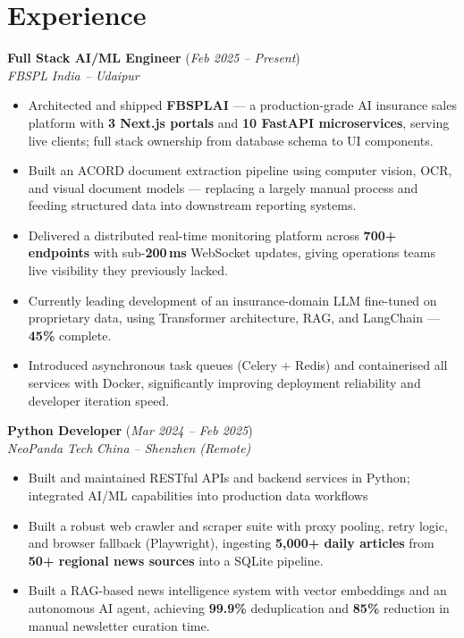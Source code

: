 \documentclass[10pt,letterpaper]{article}
\newcommand{\jobheader}[4]{%
  \textbf{#1} (\textit{#4})\\
  \textit{#2} \textemdash{} \textit{#3}
  \vspace{0.04cm}
}
\begin{document}
\vspace{0.05cm}

\section{Experience}

\jobheader{Full Stack AI/ML Engineer}{FBSPL}{India -- Udaipur}{Feb 2025 -- Present}
\begin{itemize}
  \item Architected and shipped \textbf{FBSPLAI} --- a production-grade AI insurance sales platform
  with \textbf{3 Next.js portals} and \textbf{10 FastAPI microservices}, serving live clients;
  full stack ownership from database schema to UI components.
  \item Built an ACORD document extraction pipeline using computer vision, OCR, and visual document
  models --- replacing a largely manual process and feeding structured data into downstream
  reporting systems.
  \item Delivered a distributed real-time monitoring platform across \textbf{700+ endpoints} with
  sub-\textbf{200\,ms} WebSocket updates, giving operations teams live visibility they previously lacked.
  \item Currently leading development of an insurance-domain LLM fine-tuned on proprietary data,
  using Transformer architecture, RAG, and LangChain --- \textbf{45\%} complete.
  \item Introduced asynchronous task queues (Celery + Redis) and containerised all services with
  Docker, significantly improving deployment reliability and developer iteration speed.
\end{itemize}

\vspace{0.12cm}

\jobheader{Python Developer}{NeoPanda Tech}{China -- Shenzhen (Remote)}{Mar 2024 -- Feb 2025}
\begin{itemize}
  \item Built and maintained RESTful APIs and backend services in Python;
  integrated AI/ML capabilities into production data workflows
  \item Built a robust web crawler and scraper suite with proxy pooling, retry logic, and browser
  fallback (Playwright), ingesting \textbf{5,000+ daily articles} from \textbf{50+ regional news sources}
  into a SQLite pipeline.
  \item Built a RAG-based news intelligence system with vector embeddings and an autonomous AI agent,
  achieving \textbf{99.9\%} deduplication and \textbf{85\%} reduction in manual newsletter curation time.
\end{itemize}
\end{document}

